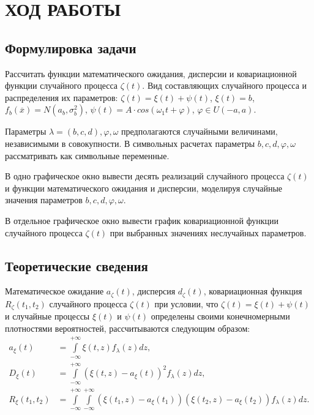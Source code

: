 \section{ХОД РАБОТЫ}

\subsection{Формулировка задачи}

Рассчитать функции математического ожидания, дисперсии и ковариационной функции
случайного процесса $ \zeta(t) $. Вид составляющих случайного процесса
и распределения их параметров:
$ \zeta(t)= \xi(t) + \psi(t) $,
$ \xi(t) = b $,
$ f_b (\overline{x}) = N(a_b, \sigma^2_b) $,
$ \psi(t) = A \cdot cos(\omega_1 t + \varphi) $,
$ \varphi \in U(-a,a)$.

Параметры $ \lambda = (b, c, d), \varphi, \omega $ предполагаются случайными величинами,
независимыми в совокупности. В символьных расчетах параметры $ b, c, d,
\varphi, \omega $ рассматривать как символьные переменные.

В одно графическое окно вывести десять реализаций случайного процесса $ \zeta(t) $
и функции математического ожидания и дисперсии, моделируя случайные значения
параметров $ b, c, d, \varphi, \omega $.

В отдельное графическое окно вывести график ковариационной функции
случайного процесса $ \zeta(t) $ при выбранных значениях неслучайных параметров.


\subsection{Теоретические сведения}

Математическое ожидание $ a_{\zeta} (t) $, дисперсия $ d_{\zeta} (t) $,
ковариационная функция $ R_{\zeta} (t_1, t_2) $ случайного процесса $ \zeta(t) $
при условии, что $ \zeta(t) = \xi(t) + \psi(t) $ и случайные процессы $ \xi(t) $
и $ \psi(t) $ определены своими конечномерными плотностями вероятностей, рассчитываются
следующим образом:
\begin{align*}
  a_{\xi}(t) &= \int\limits_{-\infty}^{+\infty}  \xi(t, z) f_{\lambda}(z) dz, \\ 
  D_{\xi}(t) &= \int\limits_{-\infty}^{+\infty} (\xi(t, z) - a_{\xi}(t))^2 f_{\lambda}(z) dz, \\
  R_{\xi}(t_1, t_2) &= \int\limits_{-\infty}^{+\infty} \int\limits_{-\infty}^{+\infty} (\xi(t_1, z) - a_{\xi}(t_1)) (\xi(t_2, z) - a_{\xi}(t_2)) f_{\lambda}(z) dz. \\
\end{align*}


